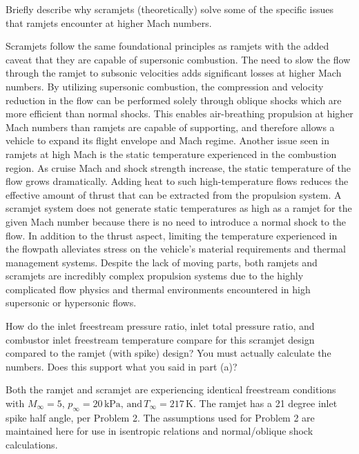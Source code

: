 \documentclass[../main.tex]{subfiles}
\begin{document}


Briefly describe why scramjets (theoretically) solve some of the specific issues that ramjets encounter at higher Mach numbers.

\discussion{}
Scramjets follow the same foundational principles as ramjets with the added caveat that they are capable of supersonic combustion.
The need to slow the flow through the ramjet to subsonic velocities adds significant losses at higher Mach numbers.
By utilizing supersonic combustion, the compression and velocity reduction in the flow can be performed solely through oblique shocks which are more efficient than normal shocks.
This enables air-breathing propulsion at higher Mach numbers than ramjets are capable of supporting, and therefore allows a vehicle to expand its flight envelope and Mach regime.
Another issue seen in ramjets at high Mach is the static temperature experienced in the combustion region.
As cruise Mach and shock strength increase, the static temperature of the flow grows dramatically.
Adding heat to such high-temperature flows reduces the effective amount of thrust that can be extracted from the propulsion system. 
A scramjet system does not generate static temperatures as high as a ramjet for the given Mach number because there is no need to introduce a normal shock to the flow.
In addition to the thrust aspect, limiting the temperature experienced in the flowpath alleviates stress on the vehicle's material requirements and thermal management systems.
Despite the lack of moving parts, both ramjets and scramjets are incredibly complex propulsion systems due to the highly complicated flow physics and thermal environments encountered in high supersonic or hypersonic flows.



How do the inlet freestream pressure ratio, inlet total pressure ratio, and combustor inlet freestream temperature compare for this scramjet design compared to the ramjet (with spike) design? 
You must actually calculate the numbers. 
Does this support what you said in part (a)?

\assumptions{}
Both the ramjet and scramjet are experiencing identical freestream conditions with \(M_\infty=5,\, p_\infty=20\,\unit{\kilo\pascal},\, \textrm{and}\,T_\infty=217\,\unit{\kelvin}\).
The ramjet has a 21 degree inlet spike half angle, per Problem 2.
The assumptions used for Problem 2 are maintained here for use in isentropic relations and normal/oblique shock calculations.
\end{document}
